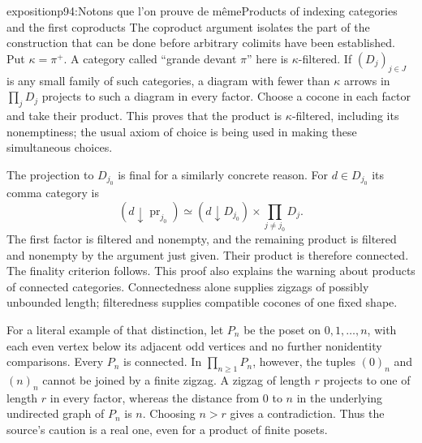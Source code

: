 \begin{dcomment}{exposition}{p94:Notons que l'on prouve de même}{Products of indexing categories and the first coproducts}
The coproduct argument isolates the part of the construction that can be done before arbitrary colimits have been established. Put $\kappa=\pi^+$. A category called ``grande devant $\pi$'' here is $\kappa$-filtered. If $(D_j)_{j\in J}$ is any small family of such categories, a diagram with fewer than $\kappa$ arrows in $\prod_jD_j$ projects to such a diagram in every factor. Choose a cocone in each factor and take their product. This proves that the product is $\kappa$-filtered, including its nonemptiness; the usual axiom of choice is being used in making these simultaneous choices.

The projection to $D_{j_0}$ is final for a similarly concrete reason. For $d\in D_{j_0}$ its comma category is
\[
(d\downarrow\operatorname{pr}_{j_0})
\simeq(d\downarrow D_{j_0})\times\prod_{j\ne j_0}D_j.
\]
The first factor is filtered and nonempty, and the remaining product is filtered and nonempty by the argument just given. Their product is therefore connected. The finality criterion follows. This proof also explains the warning about products of connected categories. Connectedness alone supplies zigzags of possibly unbounded length; filteredness supplies compatible cocones of one fixed shape.

For a literal example of that distinction, let $P_n$ be the poset on $0,1,\ldots,n$, with each even vertex below its adjacent odd vertices and no further nonidentity comparisons. Every $P_n$ is connected. In $\prod_{n\geq1}P_n$, however, the tuples $(0)_n$ and $(n)_n$ cannot be joined by a finite zigzag. A zigzag of length $r$ projects to one of length $r$ in every factor, whereas the distance from $0$ to $n$ in the underlying undirected graph of $P_n$ is $n$. Choosing $n>r$ gives a contradiction. Thus the source's caution is a real one, even for a product of finite posets.


\end{dcomment}
